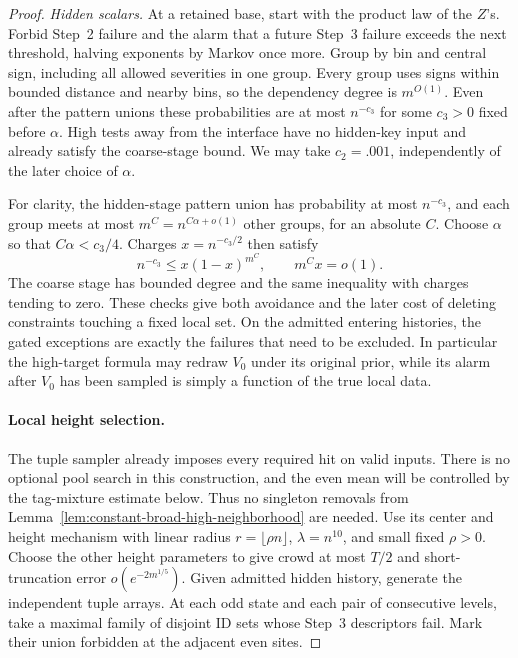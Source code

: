 \begin{proof}
\emph{Hidden scalars.} At a retained base, start with the product law
of the \(Z\)'s. Forbid Step~2 failure and the alarm that a future
Step~3 failure exceeds the next threshold, halving exponents by Markov
once more. Group by bin and central sign, including all allowed
severities in one group. Every group uses signs within bounded distance
and nearby bins, so the dependency degree is \(m^{O(1)}\).
Even after the pattern unions these probabilities are at most
\(n^{-c_3}\) for some \(c_3>0\) fixed before \(\alpha\).
High tests away from the interface have no hidden-key input and already
satisfy the coarse-stage bound. We may take \(c_2=.001\), independently
of the later choice of \(\alpha\).

For clarity, the hidden-stage pattern union has probability at most
\(n^{-c_3}\), and each group meets at most \(m^C=n^{C\alpha+o(1)}\)
other groups, for an absolute \(C\). Choose \(\alpha\) so that
\(C\alpha<c_3/4\). Charges \(x=n^{-c_3/2}\) then satisfy
\[
 n^{-c_3}\le x(1-x)^{m^C},\qquad m^C x=o(1).
\]
The coarse stage has bounded degree and the same inequality with
charges tending to zero. These checks give both avoidance and the later
cost of deleting constraints touching a fixed local set.
On the admitted entering histories, the gated exceptions are exactly the
failures that need to be excluded. In particular the high-target formula
may redraw \(V_0\) under its original prior, while its alarm after
\(V_0\) has been sampled is simply a function of the true local data.

\paragraph{Local height selection.}

The tuple sampler already imposes every required hit on valid inputs.
There is no optional pool search in this construction, and the even mean
will be controlled by the tag-mixture estimate below. Thus no singleton
removals from Lemma~\ref{lem:constant-broad-high-neighborhood} are needed.
Use its center and height mechanism with linear radius
\(r=\lfloor\rho n\rfloor\), \(\lambda=n^{10}\), and small fixed
\(\rho>0\). Choose the other height parameters to give crowd at most
\(T/2\) and short-truncation error \(o(e^{-2m^{1/5}})\).
Given admitted hidden history, generate the independent tuple arrays.
At each odd state and each pair of consecutive levels, take a maximal
family of disjoint ID sets whose Step~3 descriptors fail. Mark their
union forbidden at the adjacent even sites.


\end{proof}
